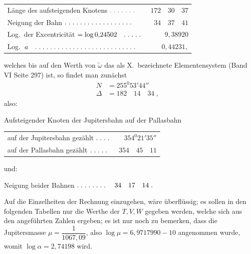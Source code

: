 \begin{landscape}
\begin{center}
\begin{tabular}{@{}l@{\quad}r@{}}
Länge des aufsteigenden Knotens \(\VSixPoint\VSixPoint\VSixPoint\VSixPoint\VSixPoint\VSixPoint\VSixPoint\)&\(172\quad30\quad37\)\\
Neigung der Bahn \(\VSixTenPoints\VSixPoint\VSixPoint\VSixPoint\VSixPoint\VSixPoint\VSixPoint\VSixPoint\VSixPoint\)&\(34\quad37\quad41\)\\
Log.\ der Excentricität \(=\log0{,}24502\quad\VSixPoint\VSixPoint\VSixPoint\VSixPoint\VSixPoint\)&\(9{,}38920\)\\
Log.\ \(a\quad\VSixTenPoints\VSixTenPoints\VSixPoint\VSixPoint\VSixPoint\VSixPoint\VSixPoint\VSixPoint\VSixPoint\)&\(0{,}44231,\)
\end{tabular}
\end{center}
\noindent welches bis auf den Werth von \(\tilde\omega\) das als X.\ bezeichnete Elementensystem (Band VI Seite 297) ist, so findet man zunächst
\[
\begin{aligned}
N&=255^0 53'44''\\
\Delta&=182\quad14\quad34\;,
\end{aligned}
\]
\noindent also:
\begin{center}
Aufsteigender Knoten der Jupitersbahn auf der Pallasbahn

\begin{tabular}{@{}l@{\quad}r@{}}
auf der Jupitersbahn gezählt \(\VSixPoint\VSixPoint\VSixPoint\VSixPoint\)&\(354^0 21'35''\)\\
auf der Pallasbahn gezählt \(\VSixPoint\VSixPoint\VSixPoint\VSixPoint\VSixPoint\)&\(354\quad45\quad11\)
\end{tabular}
\end{center}
\par\noindent\edef\VSixSavedIndent{\the\parindent}\begin{minipage}{\linewidth}\setlength{\parindent}{\VSixSavedIndent}
\noindent und:
\begin{center}
Neigung beider Bahnen \(\VSixPoint\VSixPoint\VSixPoint\VSixPoint\VSixPoint\VSixPoint\VSixPoint\VSixPoint\quad34\quad17\quad14\; .\)
\end{center}
\end{minipage}\par
\par\noindent\hspace*{\parindent}Auf die Einzelheiten der Rechnung einzugehen, wäre überflüssig; es sollen in den folgenden Tabellen nur die Werthe der \(T,V,W\) gegeben werden, welche sich aus den angeführten Zahlen ergeben; es ist nur noch zu bemerken, dass die Jupitersmasse \(\mu=\dfrac{1}{1067{,}09}\), also \(\log\mu=6{,}9717990-10\) angenommen wurde, womit \(\log\alpha=2{,}74198\) wird.
\clearpage
\endgroup
\end{landscape}
